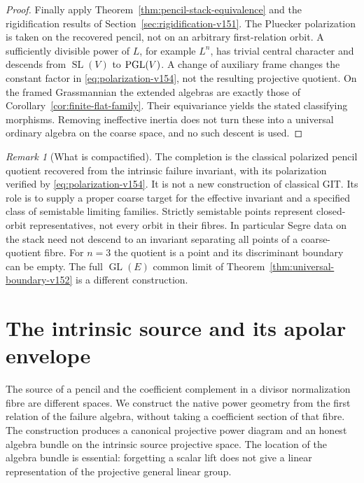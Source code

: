 \documentclass[11pt,reqno]{amsart}
\numberwithin{equation}{section}
\theoremstyle{definition}\newtheorem{definition}[theorem]{Definition}
\theoremstyle{remark}\newtheorem{remark}[theorem]{Remark}
\begin{document}
\begin{proof}
Finally apply Theorem~\ref{thm:pencil-stack-equivalence} and the
rigidification results of Section~\ref{sec:rigidification-v151}.
The Pluecker polarization is taken on the recovered pencil, not on
an arbitrary first-relation orbit. A sufficiently divisible power
of $L$, for example $L^n$, has trivial central character and descends
from $\operatorname{SL}(V)$ to $\operatorname{PGL}(V)$. A change of auxiliary frame
changes the constant factor in \eqref{eq:polarization-v154}, not the
resulting projective quotient. On the framed Grassmannian the extended
algebras are exactly those of Corollary~\ref{cor:finite-flat-family}.
Their equivariance yields the stated classifying morphisms. Removing
ineffective inertia does not turn these into a universal ordinary
algebra on the coarse space, and no such descent is used.
\end{proof}

\begin{remark}[What is compactified]\label{rem:git-scope-v154}
The completion is the classical polarized pencil quotient recovered
from the intrinsic failure invariant, with its polarization verified
by \eqref{eq:polarization-v154}. It is not a new construction of
classical GIT. Its role is to supply a proper coarse target for the
effective invariant and a specified class of semistable limiting
families. Strictly semistable points represent closed-orbit
representatives, not every orbit in their fibres. In particular Segre
data on the stack need not descend to an invariant separating all
points of a coarse-quotient fibre. For $n=3$ the quotient is a point
and its discriminant boundary can be empty. The full
$\operatorname{GL}(E)$ common limit of
Theorem~\ref{thm:universal-boundary-v152} is a different construction.
\end{remark}


\section{The intrinsic source and its apolar envelope}
\label{sec:intrinsic-envelope-v158}
The source of a pencil and the coefficient complement in a divisor
normalization fibre are different spaces. We construct the native power
geometry from the first relation of the failure algebra, without taking
a coefficient section of that fibre. The construction produces a
canonical projective power diagram and an honest algebra bundle on the
intrinsic source projective space. The location of the algebra bundle
is essential: forgetting a scalar lift does not give a linear
representation of the projective general linear group.
\end{document}
